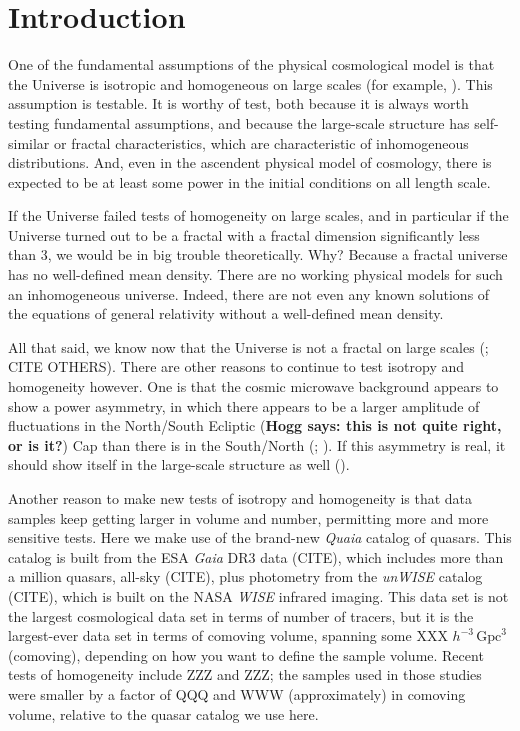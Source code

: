 \documentclass[modern]{aastex631}
\newcommand{\unit}[1]{\mathrm{#1}}
\newcommand{\Gpc}{\unit{Gpc}}
\newcommand{\hogg}[1]{\textbf{Hogg says: #1}}
\begin{document}
\section*{}
\clearpage
\section{Introduction}\label{sec:intro}\noindent
One of the fundamental assumptions of the physical cosmological model is that the Universe is isotropic and homogeneous on large scales (for example, \citealt{peebles, ryden}).
This assumption is testable.
It is worthy of test, both because it is always worth testing fundamental assumptions, and because the large-scale structure has self-similar or fractal characteristics, which are characteristic of inhomogeneous distributions.
And, even in the ascendent physical model of cosmology, there is expected to be at least some power in the initial conditions on all length scale.

If the Universe failed tests of homogeneity on large scales, and in particular if the Universe turned out to be a fractal with a fractal dimension significantly less than 3, we would be in big trouble theoretically.
Why?
Because a fractal universe has no well-defined mean density.
There are no working physical models for such an inhomogeneous universe.
Indeed, there are not even any known solutions of the equations of general relativity without a well-defined mean density.

All that said, we know now that the Universe is not a fractal on large scales (\citealt{hogg05}; CITE OTHERS).
There are other reasons to continue to test isotropy and homogeneity however.
One is that the cosmic microwave background appears to show a power asymmetry, in which there appears to be a larger amplitude of fluctuations in the North/South Ecliptic (\hogg{this is not quite right, or is it?}) Cap than there is in the South/North (\citealt{wmapanisotropy}; \citealt{planckanisotropy}).
If this asymmetry is real, it should show itself in the large-scale structure as well (\citealt{zhai}).

Another reason to make new tests of isotropy and homogeneity is that data samples keep getting larger in volume and number, permitting more and more sensitive tests.
Here we make use of the brand-new \textsl{Quaia} catalog of quasars.
This catalog is built from the ESA \textsl{Gaia} DR3 data (CITE), which includes more than a million quasars, all-sky (CITE), plus photometry from the \textsl{unWISE} catalog (CITE), which is built on the NASA \textsl{WISE} infrared imaging.
This data set is not the largest cosmological data set in terms of number of tracers, but it is the largest-ever data set in terms of comoving volume, spanning some XXX $h^{-3}\,\Gpc^3$ (comoving), depending on how you want to define the sample volume.
Recent tests of homogeneity include ZZZ and ZZZ; the samples used in those studies were smaller by a factor of QQQ and WWW (approximately) in comoving volume, relative to the quasar catalog we use here.
\end{document}
